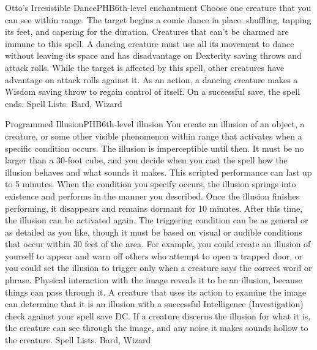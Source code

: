 \begin{spell}{Otto's Irresistible Dance}{PHB}{6th-level enchantment}
{
}
Choose one creature that you can see within range. The target begins a comic dance in place: shuffling, tapping its feet, and capering for the duration. Creatures that can’t be charmed are immune to this spell.
A dancing creature must use all its movement to dance without leaving its space and has disadvantage on Dexterity saving throws and attack rolls. While the target is affected by this spell, other creatures have advantage on attack rolls against it. As an action, a dancing creature makes a Wisdom saving throw to regain control of itself. On a successful save, the spell ends.
Spell Lists. Bard, Wizard
\end{spell}

\begin{spell}{Programmed Illusion}{PHB}{6th-level illusion}
{
}
You create an illusion of an object, a creature, or some other visible phenomenon within range that activates when a specific condition occurs. The illusion is imperceptible until then. It must be no larger than a 30-foot cube, and you decide when you cast the spell how the illusion behaves and what sounds it makes. This scripted performance can last up to 5 minutes.
When the condition you specify occurs, the illusion springs into existence and performs in the manner you described. Once the illusion finishes performing, it disappears and remains dormant for 10 minutes. After this time, the illusion can be activated again.
The triggering condition can be as general or as detailed as you like, though it must be based on visual or audible conditions that occur within 30 feet of the area. For example, you could create an illusion of yourself to appear and warn off others who attempt to open a trapped door, or you could set the illusion to trigger only when a creature says the correct word or phrase.
Physical interaction with the image reveals it to be an illusion, because things can pass through it. A creature that uses its action to examine the image can determine that it is an illusion with a successful Intelligence (Investigation) check against your spell save DC. If a creature discerns the illusion for what it is, the creature can see through the image, and any noise it makes sounds hollow to the creature.
Spell Lists. Bard, Wizard
\end{spell}

